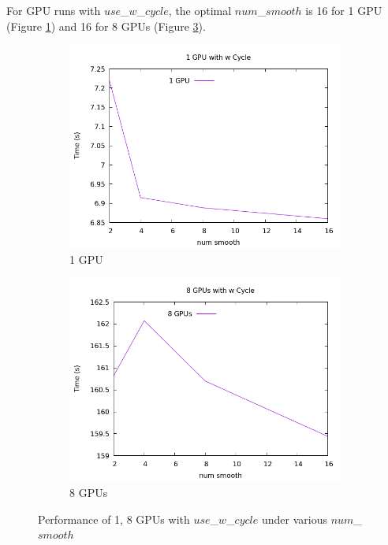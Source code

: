 \documentclass{article}
\begin{document}
For GPU runs with $use$\_$w$\_$cycle$, the optimal $num$\_$smooth$ is 16 for 1 GPU (Figure \ref{fig:1 GPU with w Cycle}) and 16 for 8 GPUs (Figure \ref{fig:8 GPUs with w Cycle}).

\begin{figure}[H]
    \begin{subfigure}{0.48\textwidth}
        \includegraphics[width=\textwidth]{1 GPU with w Cycle.png}
        \caption{1 GPU}
        \label{fig:1 GPU with w Cycle}
    \end{subfigure}
    \begin{subfigure}[b]{0.48\textwidth}
        \includegraphics[width=\textwidth]{8 GPUs with w Cycle.png}
        \caption{8 GPUs}
        \label{fig:8 GPUs with w Cycle}
    \end{subfigure}
    \caption{Performance of 1, 8 GPUs with $use$\_$w$\_$cycle$ under various $num$\_$smooth$}
\end{figure}
\end{document}
